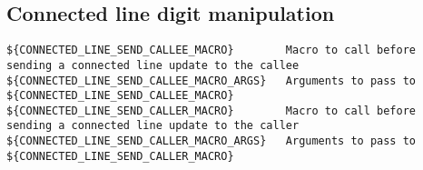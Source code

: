 \subsection{Connected line digit manipulation}
\begin{verbatim}
${CONNECTED_LINE_SEND_CALLEE_MACRO}        Macro to call before sending a connected line update to the callee
${CONNECTED_LINE_SEND_CALLEE_MACRO_ARGS}   Arguments to pass to ${CONNECTED_LINE_SEND_CALLEE_MACRO}
${CONNECTED_LINE_SEND_CALLER_MACRO}        Macro to call before sending a connected line update to the caller
${CONNECTED_LINE_SEND_CALLER_MACRO_ARGS}   Arguments to pass to ${CONNECTED_LINE_SEND_CALLER_MACRO}
\end{verbatim}
